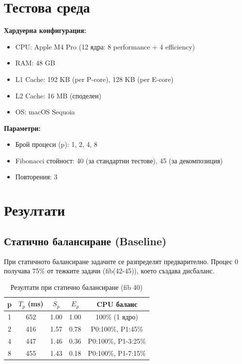 \documentclass[12pt,a4paper]{article}
\begin{document}
\section{Тестова среда}

\textbf{Хардуерна конфигурация:}
\begin{itemize}
    \item CPU: Apple M4 Pro (12 ядра: 8 performance + 4 efficiency)
    \item RAM: 48 GB
    \item L1 Cache: 192 KB (per P-core), 128 KB (per E-core)
    \item L2 Cache: 16 MB (споделен)
    \item OS: macOS Sequoia
\end{itemize}

\textbf{Параметри:}
\begin{itemize}
    \item Брой процеси (p): 1, 2, 4, 8
    \item Fibonacci стойност: 40 (за стандартни тестове), 45 (за декомпозиция)
    \item Повторения: 3
\end{itemize}

\section{Резултати}

\subsection{Статично балансиране (Baseline)}

При статичното балансиране задачите се разпределят предварително. Процес 0 получава 75\% от тежките задачи (fib(42-45)), което създава дисбаланс.

\begin{table}[H]
\centering
\begin{tabular}{ccccc}
\toprule
\textbf{p} & \textbf{$T_p$ (ms)} & \textbf{$S_p$} & \textbf{$E_p$} & \textbf{CPU баланс} \\
\midrule
1 & 652 & 1.00 & 1.00 & 100\% (1 ядро) \\
2 & 416 & 1.57 & 0.78 & P0:100\%, P1:45\% \\
4 & 447 & 1.46 & 0.36 & P0:100\%, P1-3:25\% \\
8 & 455 & 1.43 & 0.18 & P0:100\%, P1-7:15\% \\
\bottomrule
\end{tabular}
\caption{Резултати при статично балансиране (fib 40)}
\end{table}
\end{document}
